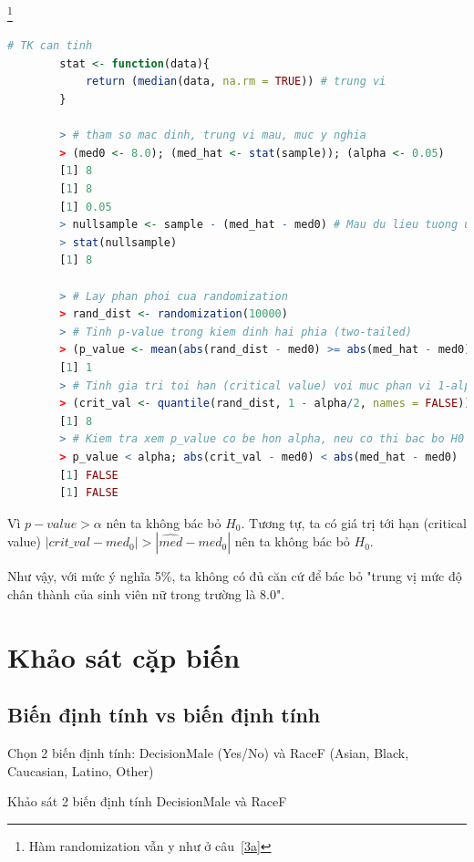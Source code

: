 \documentclass[a4paper,12pt]{article}
\begin{document}
\begin{enumerate}[label = \alph*)]
		\footnote{Hàm randomization vẫn y như ở câu~\ref{3a}}
		\begin{lstlisting}[language=R]
		# TK can tinh
		stat <- function(data){
			return (median(data, na.rm = TRUE)) # trung vi
		}
		
		> # tham so mac dinh, trung vi mau, muc y nghia
		> (med0 <- 8.0); (med_hat <- stat(sample)); (alpha <- 0.05)
		[1] 8
		[1] 8
		[1] 0.05
		> nullsample <- sample - (med_hat - med0) # Mau du lieu tuong ung voi H0
		> stat(nullsample)
		[1] 8
		 
		> # Lay phan phoi cua randomization
		> rand_dist <- randomization(10000)
		> # Tinh p-value trong kiem dinh hai phia (two-tailed)
		> (p_value <- mean(abs(rand_dist - med0) >= abs(med_hat - med0)))
		[1] 1
		> # Tinh gia tri toi han (critical value) voi muc phan vi 1-alpha/2
		> (crit_val <- quantile(rand_dist, 1 - alpha/2, names = FALSE))
		[1] 8
		> # Kiem tra xem p_value co be hon alpha, neu co thi bac bo H0
		> p_value < alpha; abs(crit_val - med0) < abs(med_hat - med0)
		[1] FALSE
		[1] FALSE
		\end{lstlisting}
		
		Vì $p-value > \alpha$ nên ta không bác bỏ $H_0$. Tương tự, ta có giá trị tới hạn (critical value) $|crit\_val - med_0| > |\hat{med} - med_0|$ nên ta không bác bỏ $H_0$. 
		
		Như vậy, với mức ý nghĩa 5\%, ta không có đủ căn cứ để bác bỏ "trung vị mức độ chân thành của sinh viên nữ trong trường là $8.0$". 
	\end{enumerate}
	
	\section{Khảo sát cặp biến}
	\subsection{Biến định tính vs biến định tính}
	Chọn 2 biến định tính: DecisionMale (Yes/No) và RaceF (Asian, Black, Caucasian, Latino, Other)
	
	Khảo sát 2 biến định tính DecisionMale và RaceF
	
\end{document}
